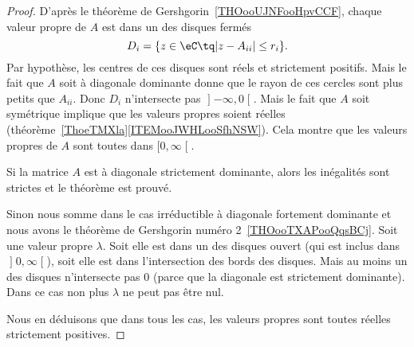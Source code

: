 \begin{proof}
	D'après le théorème de Gershgorin~\ref{THOooUJNFooHpvCCF}, chaque valeur propre de \( A\) est dans un des disques fermés
	\begin{equation}
		D_i=\{ z\in \eC\tq | z-A_{ii} |\leq r_i \}.
	\end{equation}
	Par hypothèse, les centres de ces disques sont réels et strictement positifs. Mais le fait que \( A\) soit à diagonale dominante donne que le rayon de ces cercles sont plus petits que \( A_{ii}\). Donc \( D_i\) n'intersecte pas \( \mathopen] -\infty , 0 \mathclose[\). Mais le fait que \( A\) soit symétrique implique que les valeurs propres soient réelles (théorème~\ref{ThoeTMXla}\ref{ITEMooJWHLooSfhNSW}). Cela montre que les valeurs propres de \( A\) sont toutes dans \( \mathopen[ 0 , \infty \mathclose[\).

		Si la matrice \( A\) est à diagonale strictement dominante, alors les inégalités sont strictes et le théorème est prouvé.

		Sinon nous somme dans le cas irréductible à diagonale fortement dominante et nous avons le théorème de Gershgorin numéro 2~\ref{THOooTXAPooQqsBCj}. Soit une valeur propre \( \lambda\). Soit elle est dans un des disques ouvert (qui est inclus dans \( \mathopen] 0 , \infty \mathclose[\)), soit elle est dans l'intersection des bords des disques. Mais au moins un des disques n'intersecte pas \( 0\) (parce que la diagonale est strictement dominante). Dans ce cas non plus \( \lambda\) ne peut pas être nul.

	Nous en déduisons que dans tous les cas, les valeurs propres sont toutes réelles strictement positives.
\end{proof}
